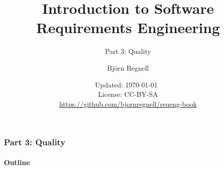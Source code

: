 \documentclass{reqenglecture}
\title{Introduction to Software Requirements Engineering}
\subtitle{Part 3: Quality}
\author{Björn Regnell}
\date{\vspace{1em}\footnotesize Updated: \today~
\\ License: CC-BY-SA 
\\ \url{https://github.com/bjornregnell/reqeng-book} 
}
\begin{document}
\maketitle

\begin{frame}
\frametitle{Part 3: Quality}
\framesubtitle{Outline}
\tableofcontents
\end{frame}





\end{document}
